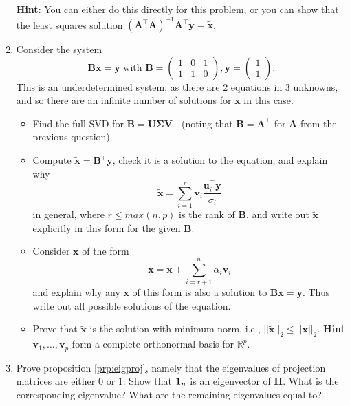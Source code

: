 \documentclass[
]{book}
\providecommand{\tightlist}{%
  \setlength{\itemsep}{0pt}\setlength{\parskip}{0pt}}
\theoremstyle{definition}
\theoremstyle{definition}
\theoremstyle{definition}
\theoremstyle{definition}
\theoremstyle{remark}
\begin{document}
\begin{enumerate}
  \textbf{Hint}: You can either do this directly for this problem, or you can show that the least squares solution \((\mathbf A^\top \mathbf A)^{-1}\mathbf A^\top \mathbf y=\tilde{\mathbf x}\).
\item
  Consider the system
  \[\mathbf B\mathbf x= \mathbf y\mbox{ with }\mathbf B=\left(\begin{array}{ccc}1&0&1\\1&1&0\end{array}
  \right),\mathbf y= \left(\begin{array}{c}1\\1\end{array}
  \right).\]
  This is an underdetermined system, as there are 2 equations in 3 unknowns, and so there are an infinite number of solutions for \(\mathbf x\) in this case.

  \begin{itemize}
  \tightlist
  \item
    Find the full SVD for \(\mathbf B=\mathbf U\boldsymbol{\Sigma}\mathbf V^\top\) (noting that \(\mathbf B=\mathbf A^\top\) for \(\mathbf A\) from the previous question).
  \item
    Compute
    \(\tilde{\mathbf x}=\mathbf B^+\mathbf y\), check it is a solution to the equation, and explain why \[\tilde{\mathbf x}= \sum_{i=1}^r \mathbf v_i \frac{\mathbf u_i^\top \mathbf y}{\sigma_i}\] in general, where \(r\leq max(n,p)\) is the rank of \(\mathbf B\), and write out \(\tilde{\mathbf x}\) explicitly in this form for the given \(\mathbf B\).
  \item
    Consider \(\mathbf x\) of the form
    \[\mathbf x= \tilde{\mathbf x} + \sum_{i=r+1}^n \alpha_i \mathbf v_i\]
    and explain why any \(\mathbf x\) of this form is also a solution to \(\mathbf B\mathbf x=\mathbf y\). Thus write out all possible solutions of the equation.
  \item
    Prove that \(\tilde{\mathbf x}\) is the solution with minimum norm, i.e., \(||\tilde{\mathbf x}||_2 \leq ||\mathbf x||_2\). \textbf{Hint} \(\mathbf v_1, \ldots, \mathbf v_p\) form a complete orthonormal basis for \(\mathbb{R}^p\).
  \end{itemize}
\item
  Prove proposition \ref{prp:eigproj}, namely that the eigenvalues of projection matrices are either 0 or 1.
  Show that \({\bf 1}_n\) is an eigenvector of \(\mathbf H\). What is the corresponding eigenvalue? What are the remaining eigenvalues equal to?
\end{enumerate}
\end{document}
